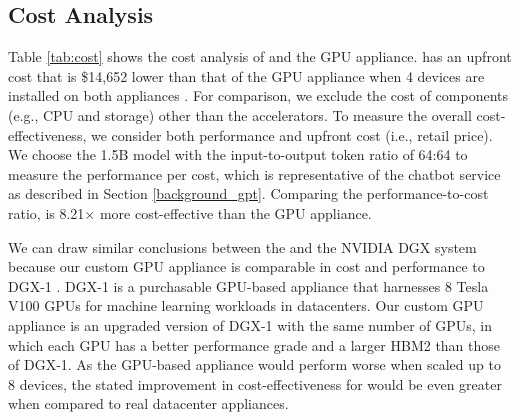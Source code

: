 \subsection{Cost Analysis}
Table \ref{tab:cost} shows the cost analysis of \sysname{} and the GPU appliance. \sysname{} has an upfront cost that is \$14,652 lower than that of the GPU appliance when 4 devices are installed on both appliances \cite{v100cost, v100cost-a, u280cost}. For comparison, we exclude the cost of components (e.g., CPU and storage) other than the accelerators. To measure the overall cost-effectiveness, we consider both performance and upfront cost (i.e., retail price). We choose the 1.5B model with the input-to-output token ratio of 64:64 to measure the performance per cost, which is representative of the chatbot service as described in Section \ref{background_gpt}. 
Comparing the performance-to-cost ratio, \sysname{} is 8.21$\times$ more cost-effective than the GPU appliance. %

We can draw similar conclusions between the \sysname{} and the NVIDIA DGX system because our custom GPU appliance is comparable in cost and performance to DGX-1 \cite{dgxcost}. DGX-1 is a purchasable GPU-based appliance that harnesses 8 Tesla V100 GPUs for machine learning workloads in datacenters. Our custom GPU appliance is an upgraded version of DGX-1 with the same number of GPUs, in which each GPU has a better performance grade and a larger HBM2 than those of DGX-1. As the GPU-based appliance would perform worse when scaled up to 8 devices, the stated improvement in cost-effectiveness for \sysname{} would be even greater when compared to real datacenter appliances.







